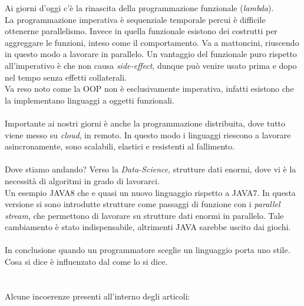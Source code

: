 \documentclass[10pt,a4paper]{book}
\begin{document}
Ai giorni d'oggi c'\`e la rinascita della programmazione funzionale (\textit{lambda}).\\
La programmazione imperativa \`e sequenziale temporale percui \`e difficile ottenerne parallelismo. Invece in quella funzionale esistono dei costrutti per aggreggare le funzioni, inteso come il comportamento. Va a mattoncini, riuscendo in questo modo a lavorare in parallelo. Un vantaggio del funzionale puro rispetto all'imperativo \`e che non causa \textit{side-effect}, dunque pu\`o venire usato prima e dopo nel tempo senza effetti collaterali.\\
Va reso noto come la OOP non \`e esclusivamente imperativa, infatti esistono che la implementano linguaggi a oggetti funzionali.\\\\
Importante ai nostri giorni \`e anche la programmazione distribuita, dove tutto viene messo su \textit{cloud}, in remoto. In questo modo i linguaggi riescono a lavorare asincronamente, sono scalabili, elastici e resistenti al fallimento.\\\\
Dove stiamo andando? Verso la \textit{Data-Science}, strutture dati enormi, dove vi \`e la necessit\`a di algoritmi in grado di lavorarci.\\
Un esempio JAVA8 che e quasi un nuovo linguaggio rispetto a JAVA7.  In questa versione si sono introdutte strutture come passaggi di funzione con i \textit{parallel stream}, che permettono di lavorare su strutture dati enormi in parallelo. Tale cambiamento \`e stato indispensabile, altrimenti JAVA sarebbe uscito dai giochi.\\\\
In conclusione quando un programmatore sceglie un linguaggio porta uno stile. Cosa si dice \`e influenzato dal come lo si dice.
\\\\\\
Alcune incoerenze presenti all'interno degli articoli:
\end{document}
